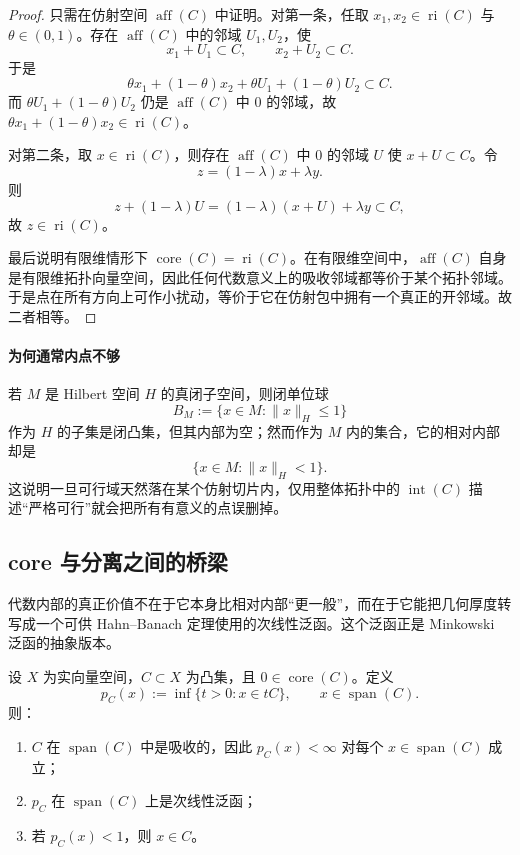 \begin{proof}
只需在仿射空间 $\operatorname{aff}(C)$ 中证明。对第一条，任取 $x_1,x_2\in \operatorname{ri}(C)$ 与 $\theta\in(0,1)$。存在 $\operatorname{aff}(C)$ 中的邻域 $U_1,U_2$，使
\[
x_1+U_1\subset C,\qquad x_2+U_2\subset C.
\]
于是
\[
\theta x_1+(1-\theta)x_2+\theta U_1+(1-\theta)U_2\subset C.
\]
而 $\theta U_1+(1-\theta)U_2$ 仍是 $\operatorname{aff}(C)$ 中 $0$ 的邻域，故 $\theta x_1+(1-\theta)x_2\in \operatorname{ri}(C)$。

对第二条，取 $x\in\operatorname{ri}(C)$，则存在 $\operatorname{aff}(C)$ 中 $0$ 的邻域 $U$ 使 $x+U\subset C$。令
\[
z=(1-\lambda)x+\lambda y.
\]
则
\[
z+(1-\lambda)U=(1-\lambda)(x+U)+\lambda y\subset C,
\]
故 $z\in\operatorname{ri}(C)$。

最后说明有限维情形下 $\operatorname{core}(C)=\operatorname{ri}(C)$。在有限维空间中，$\operatorname{aff}(C)$ 自身是有限维拓扑向量空间，因此任何代数意义上的吸收邻域都等价于某个拓扑邻域。于是点在所有方向上可作小扰动，等价于它在仿射包中拥有一个真正的开邻域。故二者相等。
\end{proof}

\paragraph{为何通常内点不够}

\begin{remark}
若 $M$ 是 Hilbert 空间 $H$ 的真闭子空间，则闭单位球
\[
B_M:=\{x\in M:\|x\|_H\le 1\}
\]
作为 $H$ 的子集是闭凸集，但其内部为空；然而作为 $M$ 内的集合，它的相对内部却是
\[
\{x\in M:\|x\|_H<1\}.
\]
这说明一旦可行域天然落在某个仿射切片内，仅用整体拓扑中的 $\operatorname{int}(C)$ 描述“严格可行”就会把所有有意义的点误删掉。
\end{remark}

\subsection{core 与分离之间的桥梁}

代数内部的真正价值不在于它本身比相对内部“更一般”，而在于它能把几何厚度转写成一个可供 Hahn--Banach 定理使用的次线性泛函。这个泛函正是 Minkowski 泛函的抽象版本。

\begin{proposition}\label{prop:core-separation-bridge}
设 $X$ 为实向量空间，$C\subset X$ 为凸集，且 $0\in \operatorname{core}(C)$。定义
\[
p_C(x):=\inf\{t>0:x\in tC\},\qquad x\in \operatorname{span}(C).
\]
则：
\begin{enumerate}
  \item $C$ 在 $\operatorname{span}(C)$ 中是吸收的，因此 $p_C(x)<\infty$ 对每个 $x\in \operatorname{span}(C)$ 成立；
  \item $p_C$ 在 $\operatorname{span}(C)$ 上是次线性泛函；
  \item 若 $p_C(x)<1$，则 $x\in C$。
\end{enumerate}
\end{proposition}

